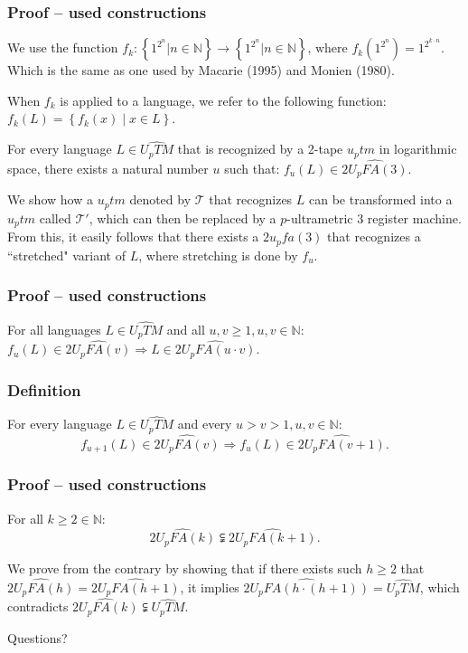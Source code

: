 \documentclass{beamer}
\begin{document}
\begin{frame}
\frametitle{Proof -- used constructions}
We use the function
$
	f_k : \left\{ 1^{2^n} | n \in \mathbb{N} \right\} \rightarrow \left\{ 1^{2^n} | n \in \mathbb{N} \right\} \textrm{, where } f_k( 1^{2^n}) = 1^{2^{k \cdot n}}
$.
Which is the same as one used by Macarie (1995) and Monien (1980).

When $f_k$ is applied to a language, we refer to the following function: $f_k(L) = \left\{ f_k(x) \middle| x\in L \right\}$.

\begin{lemma} \label{skaititaji}
For every language $L \in \widehat{U_pTM}$ that is recognized by a 2-tape $u_ptm$ in logarithmic space, there exists a natural number $u$ such that:
$
	f_u(L) \in \widehat{2\mathit{U_pFA}(3)}.
$
\end{lemma}
We show how a $u_ptm$ denoted by $\mathcal{T}$ that recognizes $L$ can be transformed into a $u_ptm$ called $\mathcal{T'}$, which can then be replaced by a $p$-ultrametric $3$ register machine. From this, it easily follows that there exists a $2\mathit{u_pfa}(3)$ that recognizes a ``stretched"  variant of $L$, where stretching is done by $f_u$.

\end{frame}
\begin{frame}
\frametitle{Proof -- used constructions}
\begin{lemma} \label{reizinajums}
For all languages $L \in \widehat{U_pTM}$ and all $u, v \geq 1, u, v \in \mathbb{N}$:
$
	f_u(L) \in \widehat{2\mathit{U_pFA}(v)} \Rightarrow L \in \widehat{2\mathit{U_pFA}(u \cdot v)}.
$
\end{lemma}
\end{frame}
\begin{frame}
\frametitle{Definition}
\begin{lemma} \label{plus1}
For every language $L \in \widehat{U_pTM}$ and every $u > v > 1, u, v \in \mathbb{N}$:
\[
	f_{u+1}(L) \in \widehat{2\mathit{U_pFA}(v)} \Rightarrow f_u(L) \in \widehat{2\mathit{U_pFA}(v + 1)}.
\]
\end{lemma}
\end{frame}
\begin{frame}
\frametitle{Proof -- used constructions}
\begin{theorem}
For all $k \geq 2 \in \mathbb{N}$:
\[
	\widehat{2\mathit{U_pFA}(k)} \subsetneqq \widehat{2\mathit{U_pFA}(k + 1)}.
\]
\end{theorem}
We prove from the contrary by showing that if there exists such $h \geq 2$ that $\widehat{2\mathit{U_pFA}(h)} = \widehat{2\mathit{U_pFA}(h + 1)}$, it implies $\widehat{2\mathit{U_pFA}(h \cdot (h + 1))} = \widehat{U_pTM}$, which contradicts $\widehat{2\mathit{U_pFA}(k)} \subsetneqq \widehat{U_pTM}$.

\end{frame}

\begin{frame}
\Huge{\centerline{Questions?}}
\end{frame}

\end{document}
